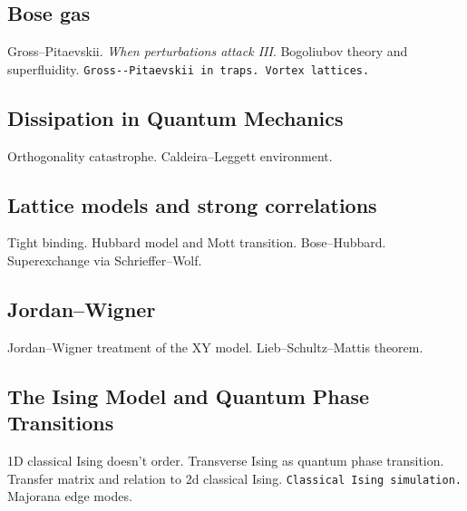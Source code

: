 \subsection{Bose gas}

Gross--Pitaevskii. \emph{When perturbations attack III}. Bogoliubov theory and superfluidity. \verb|Gross--Pitaevskii in traps. Vortex lattices.|


\subsection{Dissipation in Quantum Mechanics}

Orthogonality catastrophe. Caldeira--Leggett environment.

\subsection{Lattice models and strong correlations}

Tight binding. Hubbard model and Mott transition. Bose--Hubbard. Superexchange via Schrieffer--Wolf.

\subsection{Jordan--Wigner}

Jordan--Wigner treatment of the XY model. Lieb--Schultz--Mattis theorem.


\subsection{The Ising Model and Quantum Phase Transitions}

1D classical Ising doesn't order. Transverse Ising as quantum phase transition. Transfer matrix and relation to 2d classical Ising. \verb|Classical Ising simulation.| Majorana edge modes.








